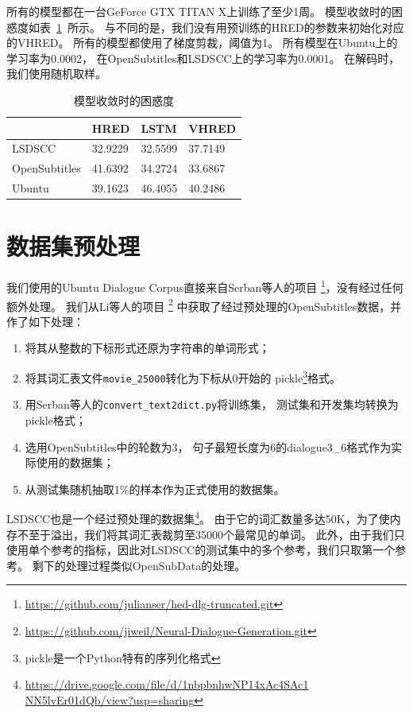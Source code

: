 所有的模型都在一台GeForce GTX TITAN X上训练了至少1周。
模型收敛时的困惑度如表~\ref{tab:converged_perplexity}~所示。
与\cite{VHRED}不同的是，我们没有用预训练的HRED的参数来初始化对应的VHRED。
所有的模型都使用了梯度剪裁，阈值为1。
所有模型在Ubuntu上的学习率为0.0002，
在OpenSubtitles和LSDSCC上的学习率为0.0001。
在解码时，我们使用随机取样。
\begin{table}[H]
    \centering
    \caption{模型收敛时的困惑度}
    \label{tab:converged_perplexity}
    \begin{tabular}{llll}
        \toprule
        \midrule
        & HRED & LSTM & VHRED \\
        \midrule
        LSDSCC & 32.9229 & 32.5599 & 37.7149 \\
        OpenSubtitles & 41.6392 & 34.2724 & 33.6867 \\
        Ubuntu & 39.1623 & 46.4055 & 40.2486 \\
        \bottomrule
    \end{tabular}
\end{table}

\section{数据集预处理}
\label{sec:dataset_proprecessing}
我们使用的Ubuntu Dialogue Corpus直接来自Serban等人的项目
\footnote{\url{https://github.com/julianser/hed-dlg-truncated.git}}，没有经过任何额外处理。
我们从Li等人的项目
\footnote{\url{https://github.com/jiweil/Neural-Dialogue-Generation.git}}
中获取了经过预处理的OpenSubtitles数据，并作了如下处理：
\begin{enumerate}
    \item 将其从整数的下标形式还原为字符串的单词形式；
    \item 将其词汇表文件\texttt{movie\_25000}转化为下标从0开始的 pickle\footnote{pickle是一个Python特有的序列化格式}格式。
    \item 用Serban等人的\texttt{convert\_text2dict.py}将训练集，
    测试集和开发集均转换为pickle格式；
    \item 选用OpenSubtitles中的轮数为3， 句子最短长度为6的dialogue3\_6格式作为实际使用的数据集；
    \item 从测试集随机抽取1\%的样本作为正式使用的数据集。
\end{enumerate}

LSDSCC也是一个经过预处理的数据集\footnote{\url{https://drive.google.com/file/d/1nbpbnhwNP14xAc4SAc1 NN5lvEr01dQb/view?usp=sharing}}。
由于它的词汇数量多达50K，为了使内存不至于溢出，我们将其词汇表裁剪至35000个最常见的单词。
此外，由于我们只使用单个参考的指标，因此对LSDSCC的测试集中的多个参考，我们只取第一个参考。
剩下的处理过程类似OpenSubData的处理。

